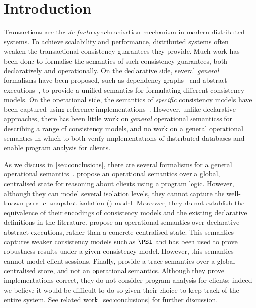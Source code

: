 \section{Introduction}
Transactions are the \emph{de facto} synchronisation mechanism in modern distributed systems.
To achieve scalability and performance, distributed systems often weaken the transactional consistency guarantees they provide. 
%
%
Much work has been done to formalise the semantics of such consistency guarantees, both
declaratively and operationally.
On the declarative side, several \emph{general} formalisms have been proposed, 
such as dependency graphs~\cite{adya} and abstract executions~\cite{framework-concur}, to provide a unified
semantics for formulating different consistency models.  
On the operational side, the semantics of \emph{specific} consistency models have
been captured using reference implementations~\cite{si,PSI,PSI-RA}. 
However, unlike declarative approaches, there has been
little work on \emph{general} operational semanticss for describing a range
of consistency models, and no work on a general operational semantics
in which to both verify implementations of distributed databases and 
enable program analysis for clients.

As we discuss in \cref{sec:conclusions}, there are several formalisms for a general operational semantics~\cite{sureshConcur,alonetogether,seebelieve}. 
\citeauthor{alonetogether} \cite{alonetogether} propose an operational semantics over a global, centralised state for reasoning about clients using a program logic. 
However, although they can model several isolation levels, they cannot capture the well-known
parallel snapshot isolation (\PSI) model. 
Moreover, they do not establish the equivalence of their encodings of consistency models 
and the existing declarative definitions in the literature. 
\citeauthor{sureshConcur} \cite{sureshConcur} propose an operational semantics over declarative abstract executions, rather than a concrete centralised state. This semantics captures weaker consistency models
such as \(\PSI\) and has been used to prove robustness results under a given consistency model.  
However, this semantics cannot model client sessions.
Finally, \citeauthor{seebelieve} \cite{seebelieve} provide a trace semantics over a global
centralised store, and not an operational semantics. 
Although they prove implementations correct, they do not consider program analysis for clients;
indeed we believe it would be difficult to do so given their choice to
keep track of the entire system.
See related work~\cref{sec:conclusions} for further discussion. 




